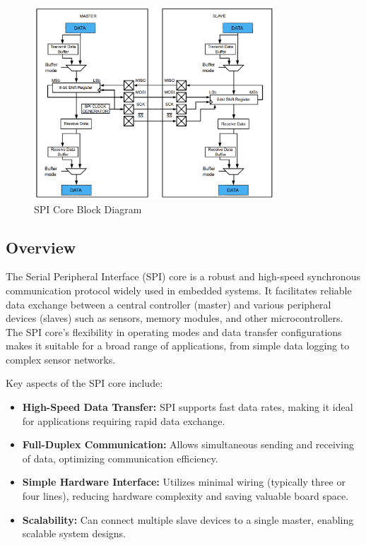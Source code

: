 \begin{figure}[H]
    \centering
    \includegraphics[width=0.8\textwidth]{images/spi_block_diagram.png}
    \caption{SPI Core Block Diagram}
    \label{fig:spi_block_diagram}
\end{figure}

\subsection{Overview}
The Serial Peripheral Interface (SPI) core is a robust and high-speed synchronous communication protocol widely used in embedded systems. It facilitates reliable data exchange between a central controller (master) and various peripheral devices (slaves) such as sensors, memory modules, and other microcontrollers. The SPI core's flexibility in operating modes and data transfer configurations makes it suitable for a broad range of applications, from simple data logging to complex sensor networks.

Key aspects of the SPI core include:
\begin{itemize}
    \item \textbf{High-Speed Data Transfer:} SPI supports fast data rates, making it ideal for applications requiring rapid data exchange.
    \item \textbf{Full-Duplex Communication:} Allows simultaneous sending and receiving of data, optimizing communication efficiency.
    \item \textbf{Simple Hardware Interface:} Utilizes minimal wiring (typically three or four lines), reducing hardware complexity and saving valuable board space.
    \item \textbf{Scalability:} Can connect multiple slave devices to a single master, enabling scalable system designs.
\end{itemize}

